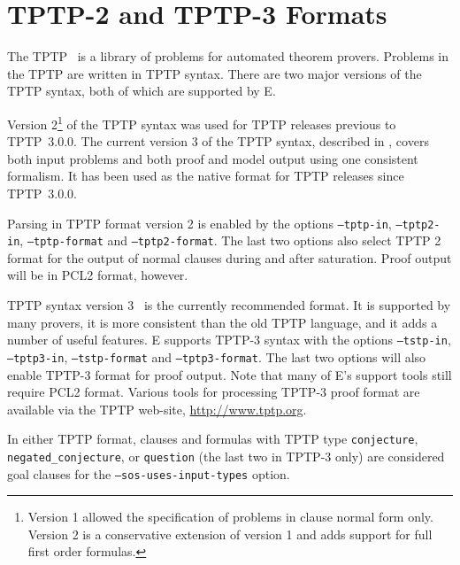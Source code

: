 \documentclass{report}
\begin{document}
\section{TPTP-2 and TPTP-3 Formats}

The TPTP~\cite{Sutcliffe:TPTP-WWW} is a library of
problems for automated theorem provers. Problems in the TPTP are
written in TPTP syntax. There are two major
versions of the TPTP syntax, both of which are supported by E.

Version 2\footnote{Version 1 allowed the specification of problems in
  clause normal form only. Version 2 is a conservative extension of
  version 1 and adds support for full first order formulas.} of the
TPTP syntax was used for TPTP releases previous to TPTP~3.0.0.  The
current version 3 of the TPTP syntax, described in
\cite{SSCG:IJCAR-2006}, covers both input problems and both proof and
model output using one consistent formalism. It has been used as the
native format for TPTP releases since TPTP~3.0.0.

Parsing in TPTP format version 2 is enabled by the options
\texttt{--tptp-in}, \texttt{--tptp2-in}, \texttt{--tptp-format} and
\texttt{--tptp2-format}. The last two options also select TPTP 2
format for the output of normal clauses during and after
saturation. Proof output will be in PCL2 format, however.

TPTP syntax version 3~\cite{SSCG:IJCAR-2006,SSCB:LPAR-2012} is the
currently recommended format. It is supported by many provers, it is
more consistent than the old TPTP language, and it adds a number of
useful features.  E supports TPTP-3 syntax with the options
\texttt{--tstp-in}, \texttt{--tptp3-in}, \texttt{--tstp-format} and
\texttt{--tptp3-format}. The last two options will also enable TPTP-3
format for proof output. Note that many of E's support tools still
require PCL2 format. Various tools for processing TPTP-3 proof format
are available via the TPTP web-site, \url{http://www.tptp.org}.

In either TPTP format, clauses and formulas with TPTP type
\texttt{conjecture}, \texttt{negated\_conjecture}, or
\texttt{question} (the last two in TPTP-3 only) are considered goal
clauses for the \texttt{--sos-uses-input-types} option.
\end{document}
